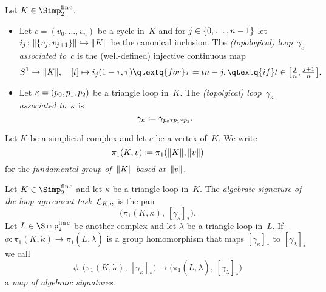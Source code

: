 \begin{thDef}
    \label{ch3:def:assoctopoloop}
    Let $K\in\finSimp$.
    \begin{itemize}
        \item
            Let $c=(v_0,\dots,v_n)$ be a cycle in~$K$ and for
            $j\in\{0,\ldots,n-1\}$ let $i_j\colon\lVert\{v_j,v_{j+1}\}\rVert 
            \hookrightarrow\lVert K\rVert$ be the canonical inclusion.
            The \emph{(topological) loop~$\gamma_c$ associated to~$c$} is the
            (well-defined) injective continuous map
            \[
                S^1\to\geom K, \quad
                [t]\mapsto i_j(1-\tau,\tau) \qtextq{for} \tau=tn-j,
                    \qtextq{if} t\in\bigl[\tfrac{j}{n}, \tfrac{j+1}{n}\bigr]
            . \]
            
        \item
            Let $\kappa=(p_0,p_1,p_2)$ be a triangle loop in~$K$. The \emph{(topolgical)
            loop~$\gamma_\kappa$ associated to~$\kappa$} is
            \[ \gamma_\kappa \coloneqq \gamma_{p_0\ast p_1\ast p_2}  . \]
    \end{itemize}
\end{thDef}

\begin{thConvention}
    Let $K$ be a simplicial complex and let $v$ be a vertex of~$K$.
    We write
    \[ \pi_1(K,v) \coloneqq \pi_1(\lVert K\rVert, \lVert v\rVert) \]
    for the \emph{fundamental group of~$\lVert K\rVert$ based at~$\lVert v\rVert$}.
\end{thConvention}

\begin{thDef}
    Let $K\in\finSimp$ and let $\kappa$ be a triangle loop in~$K$. The
    \emph{algebraic signature of the loop agreement task~$\mathcal{L}_{K,\kappa}$}
    is the pair
    \[ \bigl( \pi_1(K,\dot\kappa), \, [\gamma_\kappa]_\ast \bigr) . \]
    Let $L\in\finSimp$ be another complex and let $\lambda$ be a triangle loop
    in~$L$. If $\phi\colon\pi_1(K,\dot\kappa)\to\pi_1(L,\dot\lambda)$ is a
    group homomorphism that maps $[\gamma_\kappa]_\ast$ to
    $[\gamma_\lambda]_\ast$ we call
    \[ \phi\colon \bigl( \pi_1(K,\dot\kappa), \, [\gamma_\kappa]_\ast \bigr)
        \to \bigl( \pi_1(L,\dot\lambda), \, [\gamma_\lambda]_\ast \bigr)
    \]
    a \emph{map of algebraic signatures}.
\end{thDef}

